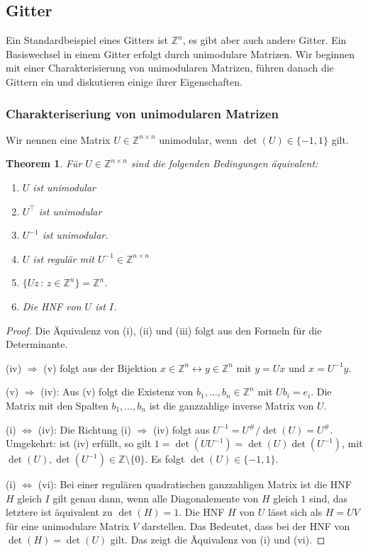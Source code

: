 \documentclass[
a4paper,12pt,
bibliography=totocnumbered,
numbers=noenddot,
]{scrartcl}
\numberwithin{equation}{subsection}
\newcommand{\Z}{\mathbb Z}
\theoremstyle{plain}
\newtheorem*{thm}{Theorem}
\theoremstyle{definition}
\begin{document}
\subsection{Gitter} 

Ein Standardbeispiel eines Gitters ist $\Z^n$, es gibt aber auch andere Gitter. Ein Basiswechsel in einem Gitter erfolgt durch unimodulare Matrizen. Wir beginnen mit einer Charakterisierung von unimodularen Matrizen, führen  danach die Gittern ein und diskutieren einige ihrer Eigenschaften. 

\subsubsection{Charakteriseriung von unimodularen Matrizen} 

Wir nennen eine Matrix $U \in \Z^{n \times n}$ unimodular, wenn $\det(U) \in \{-1,1\}$ gilt. 

\begin{thm}
		Für $U \in \Z^{n \times n}$ sind die folgenden Bedingungen äquivalent: 
		\begin{enumerate}
			\item $U$ ist unimodular
			\item $U^\top$ ist unimodular 
			\item $U^{-1}$ ist unimodular. 
			\item $U$ ist regulär mit $U^{-1} \in \Z^{n \times n}$
			\item $\{ Uz \,:\, z \in \Z^n\} = \Z^n$. 
			\item Die HNF von $U$ ist $I$. 
		\end{enumerate} 
\end{thm} 
\begin{proof}
	Die Äquivalenz von (i), (ii) und (iii) folgt aus den Formeln für die Determinante. 
	
	(iv) $\Rightarrow$ (v) folgt aus der Bijektion $x  \in \Z^n \leftrightarrow y \in \Z^n$ mit $y = U x$ und $x = U^{-1} y$. 
	
	(v) $\Rightarrow$ (iv): Aus (v) folgt die Existenz von $b_1,\ldots,b_n \in \Z^n$ mit $U b_i = e_i$. Die Matrix mit den Spalten $b_1,\ldots,b_n$ ist die ganzzahlige inverse Matrix von $U$. 

	(i) $\Leftrightarrow$ (iv): Die Richtung (i) $\Rightarrow$ (iv) folgt aus $U^{-1} = U^{\#} / \det(U) = U^{\#}$. Umgekehrt: ist (iv) erfüllt, so gilt $1= \det(U U^{-1} ) = \det(U) \det(U^{-1})$, mit $\det(U), \det(U^{-1}) \in \Z \setminus \{0\}$. Es folgt $\det(U) \in \{-1,1\}$. 
	
	(i) $\Leftrightarrow$ (vi): Bei einer regulären quadratischen ganzzahligen Matrix ist die HNF $H$ gleich $I$ gilt genau dann, wenn alle Diagonalemente von $H$ gleich $1$ sind, das letztere ist äquivalent zu $\det(H)=1$. Die HNF $H$ von $U$ lässt sich als $H = U V$ für eine unimodulare Matrix $V$ darstellen. Das Bedeutet, dass bei der HNF von $\det(H) = \det(U)$ gilt. Das zeigt die Äquivalenz von (i) und (vi).   
\end{proof} 
\end{document}
